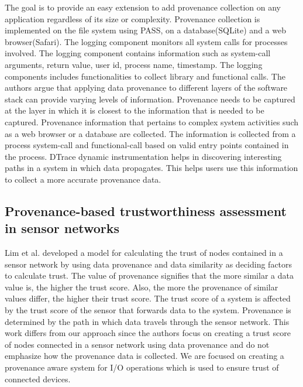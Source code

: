 The goal is to provide an easy extension to add provenance collection on any application regardless of its size or complexity. Provenance collection is implemented on the file system using PASS, on a database(SQLite) and a web browser(Safari). 
The logging component monitors all system calls for processes involved. The logging component contains information such as system-call arguments, return value, user id, process name, timestamp. The logging components includes functionalities to collect library and functional calls. The authors argue that applying data provenance to different layers of the software stack can provide varying levels of information. Provenance needs to be captured at the layer in which it is closest to the information that is needed to be captured. Provenance information that pertains to complex system activities such as a web browser or a database are collected. The information is collected from a process system-call and functional-call based on valid entry points contained in the process. DTrace dynamic instrumentation helps in discovering interesting paths in a system in which data propagates. This helps users use this information to collect a more accurate provenance data.


\subsection{Provenance-based trustworthiness assessment in sensor networks}
Lim et al. \cite{lim} developed a
model for calculating the trust of nodes contained in a sensor network by using data
provenance and data similarity as deciding factors to calculate trust. The value of
provenance signifies that the more similar a data value is, the higher the trust score.
Also, the more the provenance of similar values differ, the higher their trust score. The trust score of a system is affected by the trust score of the sensor that forwards data to the system. Provenance is determined by the path in which data travels through the sensor network. This work differs from our approach since the authors focus on creating a trust score
of nodes connected in a sensor network using data provenance and do not emphasize
how the provenance data is collected. We are focused on creating a
provenance aware system for I/O operations which is used to ensure trust of
connected devices. 

